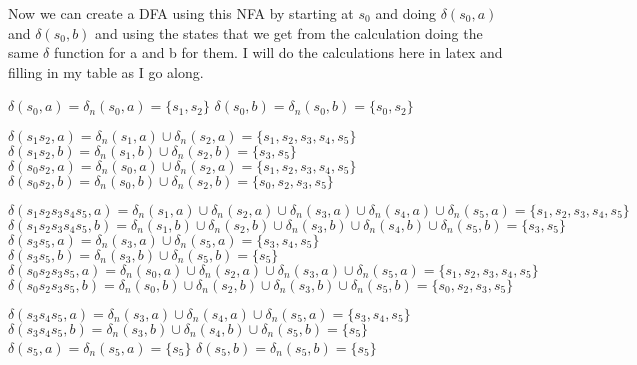 \documentclass{article}
\begin{document}
Now we can create a DFA using this NFA by starting at $s_0$ and doing $\delta (s_0,a)$ and $\delta (s_0,b)$
and using the states that we get from the calculation doing the same $\delta$ function for a and b for them. 
I will do the calculations here in latex and filling in my table as I go along.

$\delta(s_0,a) = \delta_n (s_0,a) = \{s_1,s_2\}$ \newline
$\delta(s_0,b) = \delta_n (s_0,b) = \{s_0,s_2\}$ 

$\delta(s_1s_2,a) = \delta_n (s_1,a) \cup \delta_n (s_2,a) = \{s_1,s_2,s_3,s_4,s_5\}$\newline
$\delta(s_1s_2,b) = \delta_n (s_1,b) \cup \delta_n (s_2,b) = \{s_3,s_5\}$\newline
$\delta(s_0s_2,a) = \delta_n (s_0,a) \cup \delta_n (s_2,a) = \{s_1,s_2,s_3,s_4,s_5\}$ \newline
$\delta(s_0s_2,b) = \delta_n (s_0,b) \cup \delta_n (s_2,b) = \{s_0,s_2,s_3,s_5\}$

$\delta(s_1s_2s_3s_4s_5,a) = \delta_n (s_1,a) \cup \delta_n (s_2,a) \cup \delta_n (s_3,a) \cup \delta_n (s_4,a) \cup \delta_n (s_5,a) = \{s_1,s_2,s_3,s_4,s_5\}$ \newline
$\delta(s_1s_2s_3s_4s_5,b) = \delta_n (s_1,b) \cup \delta_n (s_2,b) \cup \delta_n (s_3,b) \cup \delta_n (s_4,b) \cup \delta_n (s_5,b) = \{s_3,s_5\}$\newline
$\delta(s_3s_5,a) = \delta_n (s_3,a) \cup \delta_n (s_5,a) = \{s_3,s_4,s_5\}$\newline
$\delta(s_3s_5,b) = \delta_n (s_3,b) \cup \delta_n (s_5,b) = \{s_5\}$\newline
$\delta(s_0s_2s_3s_5,a) = \delta_n (s_0,a) \cup \delta_n (s_2,a) \cup \delta_n (s_3,a) \cup \delta_n (s_5,a) = 
\{s_1,s_2,s_3,s_4,s_5\}$\newline
$\delta(s_0s_2s_3s_5,b) = \delta_n (s_0,b) \cup \delta_n (s_2,b) \cup \delta_n (s_3,b) \cup \delta_n (s_5,b) = 
\{s_0,s_2,s_3,s_5\}$

$\delta(s_3s_4s_5,a) = \delta_n (s_3,a) \cup \delta_n (s_4,a) \cup \delta_n (s_5,a) = \{s_3,s_4,s_5\}$ \newline
$\delta(s_3s_4s_5,b) = \delta_n (s_3,b) \cup \delta_n (s_4,b) \cup \delta_n (s_5,b) = \{s_5\}$\newline
$\delta(s_5,a) = \delta_n (s_5,a) = \{s_5\}$\newline
$\delta(s_5,b) = \delta_n (s_5,b) = \{s_5\}$
\end{document}
